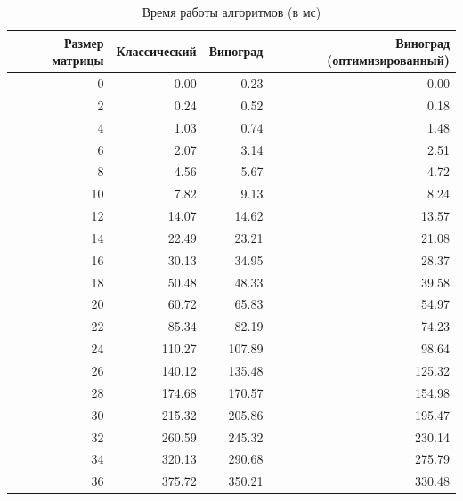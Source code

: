 \begin{table}[h]
    \begin{center}
        \begin{threeparttable}
            \captionsetup{justification=raggedright,singlelinecheck=off}
            \caption{Время работы алгоритмов (в мс)}
            \label{tbl:time_mes}
            \begin{tabular}{|r|r|r|r|}
                \hline
                Размер матрицы & Классический & Виноград & Виноград (оптимизированный) \\
                \hline
                0  & 0.00  & 0.23  & 0.00  \\
                \hline
                2  & 0.24  & 0.52  & 0.18  \\
                \hline
                4  & 1.03  & 0.74  & 1.48  \\
                \hline
                6  & 2.07  & 3.14  & 2.51  \\
                \hline
                8  & 4.56  & 5.67  & 4.72  \\
                \hline
                10 & 7.82  & 9.13  & 8.24  \\
                \hline
                12 & 14.07 & 14.62 & 13.57 \\
                \hline
                14 & 22.49 & 23.21 & 21.08 \\
                \hline
                16 & 30.13 & 34.95 & 28.37 \\
                \hline
                18 & 50.48 & 48.33 & 39.58 \\
                \hline
                20 & 60.72 & 65.83 & 54.97 \\
                \hline
                22 & 85.34 & 82.19 & 74.23 \\
                \hline
                24 & 110.27 & 107.89 & 98.64 \\
                \hline
                26 & 140.12 & 135.48 & 125.32 \\
                \hline
                28 & 174.68 & 170.57 & 154.98 \\
                \hline
                30 & 215.32 & 205.86 & 195.47 \\
                \hline
                32 & 260.59 & 245.32 & 230.14 \\
                \hline
                34 & 320.13 & 290.68 & 275.79 \\
                \hline
                36 & 375.72 & 350.21 & 330.48 \\

\end{tabular}
\end{threeparttable}
\end{center}
\end{table}
